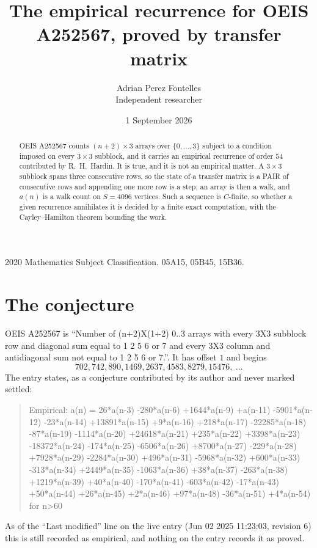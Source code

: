 \documentclass[11pt,a4paper]{article}
\title{The empirical recurrence for OEIS A252567, proved by transfer matrix}
\author{Adrian Perez Fontelles\\ \small Independent researcher}
\date{1 September 2026}
\theoremstyle{plain}
\theoremstyle{definition}
\begin{document}
\maketitle

\begin{abstract}
OEIS A252567 counts $(n+2)\times3$ arrays over $\{0,\dots,3\}$ subject to a condition imposed on
every $3\times3$ subblock, and it carries an empirical recurrence of order $54$
contributed by R.~H.~Hardin. It is true, and it is not an empirical matter. A $3\times3$
subblock spans three consecutive rows, so the state of a transfer matrix is a PAIR of
consecutive rows and appending one more row is a step; an array is then a walk, and
$a(n)$ is a walk count on $S=4096$ vertices. Such a sequence is $C$-finite, so whether a given
recurrence annihilates it is decided by a finite exact computation, with the Cayley--Hamilton
theorem bounding the work.
\end{abstract}

\noindent\small 2020 Mathematics Subject Classification. 05A15, 05B45, 15B36.\normalsize

\section{The conjecture}

OEIS A252567 is ``Number of (n+2)X(1+2) 0..3 arrays with every 3X3 subblock row and diagonal sum equal to 1 2 5 6 or 7 and every 3X3 column and antidiagonal sum not equal to 1 2 5 6 or 7.''. It has offset $1$ and begins
\[
702, 742, 890, 1469, 2637, 4583, 8279, 15476,\ \dots
\]
The entry states, as a conjecture contributed by its author and never marked settled:
\begin{quote}
Empirical: a(n) = 26*a(n-3) -280*a(n-6) +1644*a(n-9) +a(n-11) -5901*a(n-12) -23*a(n-14) +13891*a(n-15) +9*a(n-16) +218*a(n-17) -22285*a(n-18) -87*a(n-19) -1114*a(n-20) +24618*a(n-21) +235*a(n-22) +3398*a(n-23) -18372*a(n-24) -174*a(n-25) -6506*a(n-26) +8700*a(n-27) -229*a(n-28) +7928*a(n-29) -2284*a(n-30) +496*a(n-31) -5968*a(n-32) +600*a(n-33) -313*a(n-34) +2449*a(n-35) -1063*a(n-36) +38*a(n-37) -263*a(n-38) +1219*a(n-39) +40*a(n-40) -170*a(n-41) -603*a(n-42) -17*a(n-43) +50*a(n-44) +26*a(n-45) +2*a(n-46) +97*a(n-48) -36*a(n-51) +4*a(n-54) for n>60
\end{quote}
As of the ``Last modified'' line on the live entry (Jun 02 2025 11:23:03, revision 6) this is still
recorded as empirical, and nothing on the entry records it as proved.
\end{document}
